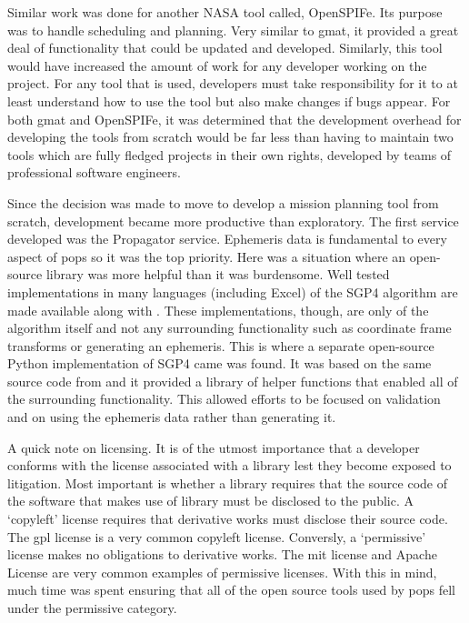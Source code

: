 
Similar work was done for another NASA tool called, OpenSPIFe. Its purpose was
to handle scheduling and planning. Very similar to \gls{gmat}, it provided a
great deal of functionality that could be updated and developed. Similarly,
this tool would have increased the amount of work for any developer working on
the project. For any tool that is used, developers must take responsibility for
it to at least understand how to use the tool but also make changes if bugs
appear. For both \gls{gmat} and OpenSPIFe, it was determined that the
development overhead for developing the tools from scratch would be far less
than having to maintain two tools which are fully fledged projects in their own
rights, developed by teams of professional software engineers.

Since the decision was made to move to develop a mission planning tool from
scratch, development became more productive than exploratory. The first service
developed was the Propagator service. Ephemeris data is fundamental to every
aspect of \gls{pops} so it was the top priority. Here was a situation where an
open-source library was more helpful than it was burdensome. Well tested
implementations in many languages (including Excel) of the SGP4 algorithm are
made available along with \cite{vallado_revisiting_2006}. These
implementations, though, are only of the algorithm itself and not any
surrounding functionality such as coordinate frame transforms or generating an
ephemeris. This is where a separate open-source Python implementation of SGP4
came was found. It was based on the same source code from
\cite{vallado_revisiting_2006} and it provided a library of helper functions
that enabled all of the surrounding functionality.  This allowed efforts to be
focused on validation and on using the ephemeris data rather than generating
it.

A quick note on licensing. It is of the utmost importance that a developer
conforms with the license associated with a library lest they become exposed to
litigation. Most important is whether a library requires that the source code
of the software that makes use of library must be disclosed to the public. A
`copyleft' license requires that derivative works must disclose their source
code. The \gls{gpl} license is a very common copyleft license.  Conversly, a
`permissive' license makes no obligations to derivative works. The \gls{mit}
license and Apache License are very common examples of permissive licenses.
With this in mind, much time was spent ensuring that all of the open source
tools used by \gls{pops} fell under the permissive category.  

